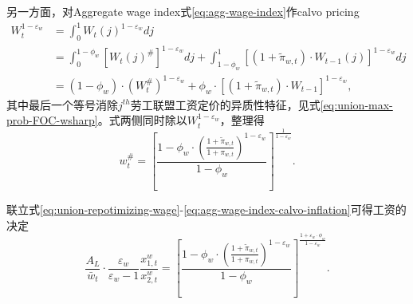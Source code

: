 另一方面，对Aggregate wage index式\eqref{eq:agg-wage-index}作calvo pricing
\begin{align*}
\label{eq:agg-wage-index-calvo}
  W_t^{1-\varepsilon_w} &= \int_{0}^{1} W_t(j)^{1-\varepsilon_w} dj \nonumber \\
                        &= \int_{0}^{1-\phi_w} \left[W_t(j)^{\#}\right]^{1-\varepsilon_w} dj+ \int_{1-\phi_w}^{1} \left[(1+\tilde{\pi}_{w,t}) \cdot W_{t-1}(j)\right]^{1-\varepsilon_w} dj \nonumber \\
&= (1-\phi_w) \cdot \left(W_t^{\#}\right)^{1-\varepsilon_w} + \phi_w \cdot \left[\left(1+\tilde{\pi}_{w,t}\right) \cdot W_{t-1}\right]^{1-\varepsilon_w},
\end{align*}
其中最后一个等号消除$j^{th}$劳工联盟工资定价的异质性特征，见式\eqref{eq:union-max-prob-FOC-wsharp}。式两侧同时除以$W_t^{1-\varepsilon_w}$，整理得
\begin{equation}
  \label{eq:agg-wage-index-calvo-inflation}
  w_t^{\#} = \left[\frac{
      1-\phi_w \cdot \left(\frac{
          1+\tilde{\pi}_{w,t}
        }{
          1+\pi_{w,t}
        }\right)^{1-\varepsilon_w}
    }{
      1-\phi_w
    }\right]^{\frac{1}{1-\varepsilon_w}}.
\end{equation}


联立式\eqref{eq:union-repotimizing-wage}-\eqref{eq:agg-wage-index-calvo-inflation}可得工资的决定
\begin{equation}
  \label{eq:wage-rate-auxiliary}
  \frac{A_L}{\bar{w}_{t}} \cdot \frac{\varepsilon_w}{\varepsilon_w -1} \frac{x_{1,t}^w}{x_{2,t}^w} =\left[\frac{1-\phi_w \cdot \left(\frac{1+\tilde{\pi}_{w,t}}{1+\pi_{w,t}}\right)^{1-\varepsilon_w}}{1-\phi_w} \right]^{\frac{1+\varepsilon_w \cdot \phi_w}{1-\varepsilon_w}}.
\end{equation}

